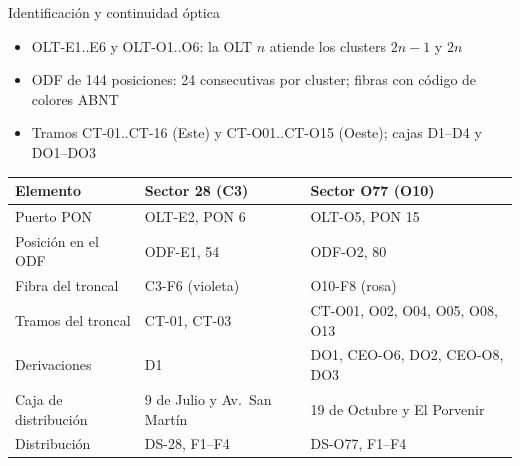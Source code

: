 \begin{frame}{Identificación y continuidad óptica}
  \footnotesize
  \begin{itemize}
    \item OLT-E1..E6 y OLT-O1..O6: la OLT $n$ atiende los clusters $2n-1$ y $2n$
    \item ODF de 144 posiciones: 24 consecutivas por cluster; fibras con código de colores ABNT
    \item Tramos CT-01..CT-16 (Este) y CT-O01..CT-O15 (Oeste); cajas D1--D4 y DO1--DO3
  \end{itemize}
  \vspace{0.1cm}
  \scriptsize
  \begin{tabular}{lll}
    \toprule
    \textbf{Elemento} & \textbf{Sector 28 (C3)} & \textbf{Sector O77 (O10)} \\
    \midrule
    Puerto PON & OLT-E2, PON 6 & OLT-O5, PON 15 \\
    Posición en el ODF & ODF-E1, 54 & ODF-O2, 80 \\
    Fibra del troncal & C3-F6 (violeta) & O10-F8 (rosa) \\
    Tramos del troncal & CT-01, CT-03 & CT-O01, O02, O04, O05, O08, O13 \\
    Derivaciones & D1 & DO1, CEO-O6, DO2, CEO-O8, DO3 \\
    Caja de distribución & 9 de Julio y Av.\ San Martín & 19 de Octubre y El Porvenir \\
    Distribución & DS-28, F1--F4 & DS-O77, F1--F4 \\
    \bottomrule
  \end{tabular}
\end{frame}

